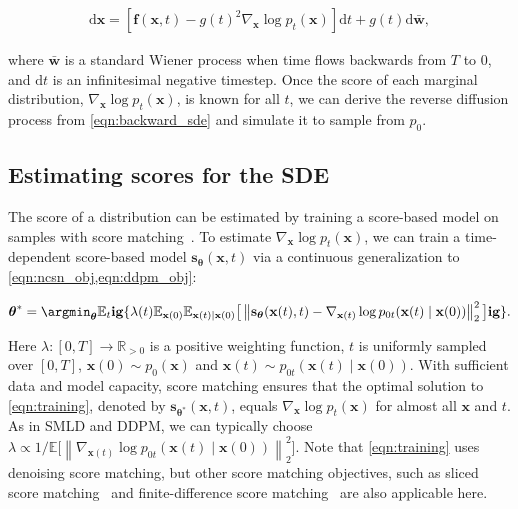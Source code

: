 \begin{align}
    \mathrm{d} \mathbf{x} = [\mathbf{f}(\mathbf{x}, t) - g(t)^2  \nabla_{\mathbf{x}}  \log p_t(\mathbf{x})] \mathrm{d} t + g(t) \mathrm{d} \bar{\mathbf{w}},\label{eqn:backward_sde}
\end{align}

where $\bar{\mathbf{w}}$ is a standard Wiener process when time flows backwards from $T$ to $0$, and $\mathrm{d} t$ is an infinitesimal negative timestep. Once the score of each marginal distribution, $\nabla_\mathbf{x} \log p_t(\mathbf{x})$, is known for all $t$, we can derive the reverse diffusion process from \ref{eqn:backward_sde} and simulate it to sample from $p_0$.

\subsection{Estimating scores for the SDE}\label{sec:training}
The score of a distribution can be estimated by training a score-based model on samples with score matching~\citep{hyvarinen2005estimation,song2019sliced}. To estimate $\nabla_\mathbf{x} \log p_t(\mathbf{x})$, we can train a time-dependent score-based model $\mathbf{s}_{\boldsymbol{\theta}}(\mathbf{x}, t)$ via a continuous generalization to \ref{eqn:ncsn_obj,eqn:ddpm_obj}:

\begin{align}
   {\boldsymbol{\theta}}^* = \argmin_{\boldsymbol{\theta}} 
   \mathbb{E}_{t}\mathbf{ig}\{\lambda(t) \mathbb{E}_{\mathbf{x}(0)}\mathbb{E}_{\mathbf{x}(t) \mid \mathbf{x}(0) }
   \big[\left\lVert\mathbf{s}_{\boldsymbol{\theta}}(\mathbf{x}(t), t) - \nabla_{\mathbf{x}(t)}\log p_{0t}(\mathbf{x}(t) \mid \mathbf{x}(0))\right\rVert_2^2 \big]\mathbf{ig}\}
   . \label{eqn:training}
\end{align}

Here $\lambda: [0, T] \to \mathbb{R}_{>0}$ is a positive weighting function, $t$ is uniformly sampled over $[0, T]$, $\mathbf{x}(0) \sim p_0(\mathbf{x})$ and $\mathbf{x}(t) \sim p_{0t}(\mathbf{x}(t) \mid \mathbf{x}(0))$. With sufficient data and model capacity, score matching ensures that the optimal solution to \ref{eqn:training}, denoted by $\mathbf{s}_{{\boldsymbol{\theta}}^\ast}(\mathbf{x}, t)$, equals $\nabla_\mathbf{x} \log p_t(\mathbf{x})$ for almost all $\mathbf{x}$ and $t$. As in SMLD and DDPM, we can typically choose $\lambda \propto 1/{\mathbb{E}\big[\left\lVert\nabla_{\mathbf{x}(t)}\log p_{0t}(\mathbf{x}(t) \mid \mathbf{x}(0))\right\rVert_2^2\big]}$. Note that \ref{eqn:training} uses denoising score matching, but other score matching objectives, such as sliced score matching~\citep{song2019sliced} and finite-difference score matching~\citep{pang2020efficient} are also applicable here. 

